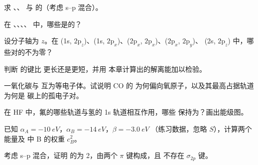 \begin{exercise}[$\star$]\label{exo:b2:diatomic-mos:2}
求 、、 与  的（考虑 s--p
混合）。
\end{exercise}

\begin{exercise}[$\star$]\label{exo:b2:diatomic-mos:3}
在 、、、、 中，哪些是的？
\end{exercise}

\begin{exercise}[$\star$]\label{exo:b2:diatomic-mos:4}
设分子轴为 $z$。在 (1s, $2\mathrm p_z$)、(1s,
$2\mathrm p_x$)、($2\mathrm p_x$, $2\mathrm p_x$)、($2\mathrm p_x$, $2\mathrm p_y$)、
(2s, $2\mathrm p_z$) 中，哪些对的不为零？
\end{exercise}

\begin{exercise}[$\star\star$]\label{exo:b2:diatomic-mos:5}
判断  的键比  更长还是更短，并用
本章计算出的解离能加以检验。
\end{exercise}

\begin{exercise}[$\star\star$]\label{exo:b2:diatomic-mos:6}
一氧化碳与  互为等电子体。试说明 CO 的
为何偏向氧原子，以及其最高占据轨道为何是
碳上的孤电子对。
\end{exercise}

\begin{exercise}[$\star\star$]\label{exo:b2:diatomic-mos:7}
在 HF 中，氟的哪些轨道与氢的 1s 轨道相互作用，哪些
保持为？画出能级图。
\end{exercise}

\begin{exercise}[$\star\star$]\label{exo:b2:diatomic-mos:8}
已知 $\alpha_A = \qty{-10}{eV}$，$\alpha_B = \qty{-14}{eV}$，$\beta = \qty{-3.0}{eV}$
（练习数据，忽略 $S$），计算两个能量及
中 B 的权重 $c_B^2$。
\end{exercise}

\begin{exercise}[$\star\star$]\label{exo:b2:diatomic-mos:9}
考虑 s--p 混合，证明  的为 2，由两个 $\pi$ 键构成，且
不存在 $\sigma_{2p}$ 键。
\end{exercise}

